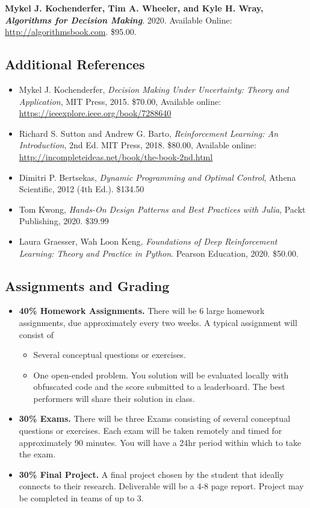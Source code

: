 \documentclass[9pt]{article}
\begin{document}
\textbf{Mykel J. Kochenderfer, Tim A. Wheeler, and Kyle H. Wray, \textit{Algorithms for Decision Making}}. 2020. Available Online: \url{http://algorithmsbook.com}. \$95.00.

\subsection*{Additional References}

\begin{itemize}[noitemsep]
    \item Mykel J. Kochenderfer, \textit{Decision Making Under Uncertainty: Theory and Application}, MIT Press, 2015. \$70.00, Available online: \url{https://ieeexplore.ieee.org/book/7288640}
    \item Richard S. Sutton and Andrew G. Barto, \textit{Reinforcement Learning: An Introduction}, 2nd Ed. MIT Press, 2018. \$80.00, Available online: \url{http://incompleteideas.net/book/the-book-2nd.html}
    \item Dimitri P. Bertsekas, \textit{Dynamic Programming and Optimal Control}, Athena Scientific, 2012 (4th Ed.). \$134.50
    \item Tom Kwong, \textit{Hands-On Design Patterns and Best Practices with Julia}, Packt Publishing, 2020. \$39.99
    \item Laura Graesser, Wah Loon Keng, \textit{Foundations of Deep Reinforcement Learning: Theory and Practice in Python}. Pearson Education, 2020. \$50.00.
\end{itemize}


\begin{samepage}
\section*{Assignments and Grading}

\begin{itemize}[nosep]
    \item \textbf{40\% Homework Assignments.}
There will be 6 large homework assignments, due approximately every two weeks. A typical assignment will consist of
\begin{itemize}[nosep]
    \item Several conceptual questions or exercises.
    \item One open-ended problem. You solution will be evaluated locally with obfuscated code and the score submitted to a leaderboard. The best performers will share their solution in class.
\end{itemize}

\item \textbf{30\% Exams.}
There will be three Exams consisting of several conceptual questions or exercises. Each exam will be taken remotely and timed for approximately 90 minutes. You will have a 24hr period within which to take the exam.

\item \textbf{30\% Final Project.}
A final project chosen by the student that ideally connects to their research. Deliverable will be a 4-8 page report. Project may be completed in teams of up to 3.
\end{itemize}
\end{samepage}
\end{document}
